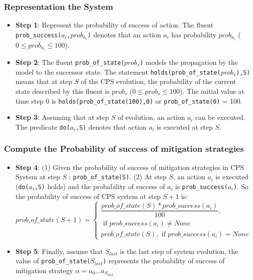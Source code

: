 \documentclass{beamer}
\begin{document}
\begin{frame}[fragile]
	\frametitle{Representation the System}
	\begin{itemize}
		\item {\bf Step 1}: Represent the probability of success of action. The fluent {\tt prob\_success($a_i$,$prob_{a_i}$)} denotes that an action $a_i$ has probability $prob_{a_i}$ ($0 \leq prob_{a_i} \leq 100$).
		\item {\bf Step 2}: The fluent {\tt prob\_of\_state($prob_s$)} models the propagation by the model to the successor state. The statement {\tt holds(prob\_of\_state($prob_s$),S)} means that at step $S$ of the CPS evolution, the probability of the current state described by this fluent is $prob_s$ ($0 \leq prob_s \leq 100$). The initial value at time step 0 is {\tt holds(prob\_of\_state(100),0)} or {\tt prob\_of\_state(0)} = 100.
		\item {\bf Step 3}: Assuming that at step $S$ of evolution, an action $a_i$ can be executed. The predicate {\tt do($a_i$,S)} denotes that action $a_i$ is executed at step $S$.
	\end{itemize}
\end{frame}

\begin{frame}[fragile]
	\frametitle{Compute the Probability of success of mitigation strategies}
	\begin{itemize}
		\item {\bf Step 4}: (1) Given the probability of success of mitigation strategies in CPS System at step $S$ : {\tt prob\_of\_state(S)}. (2) At step $S$, an action $a_i$ is executed ({\tt do($a_i$,S)} holds) and the probability of success of $a_i$ is {\tt prob\_success($a_i$)}. So the probability of success of CPS system at step $S + 1$ is:
		$$
			prob\_of\_state(S+1) = 
			\begin{cases}
			\dfrac{prob\_of\_state(S)*prob\_success(a_i)}{100}, \\ \text{ if } prob\_success(a_i) \neq None \\
			prob\_of\_state(S), \text{ if } prob\_success(a_i) = None 
			\end{cases} 
		$$
		\item {\bf Step 5}: Finally, assume that $S_{last}$ is the last step of system evolution, the value of {\tt prob\_of\_state($S_{last}$)} represents the probability of success of mitigation strategy $\alpha = a_0...a_{S_{last}}$
	
	\end{itemize}
\end{frame}

%


        
\end{document}
